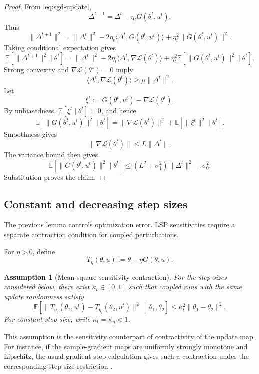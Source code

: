 \documentclass{article}
\newtheorem{assumption}{Assumption}
\numberwithin{equation}{section}
\begin{document}
\begin{proof}
From \eqref{eq:sgd-update},
\[
\Delta^{t+1}
=
\Delta^t-\eta_tG(\theta^t,u^t).
\]
Thus
\[
\|\Delta^{t+1}\|^2
=
\|\Delta^t\|^2
-
2\eta_t\langle \Delta^t,G(\theta^t,u^t)\rangle
+
\eta_t^2\|G(\theta^t,u^t)\|^2 .
\]
Taking conditional expectation gives
\[
\mathbb{E}
[
\|\Delta^{t+1}\|^2
\mid
\theta^t
]
=
\|\Delta^t\|^2
-
2\eta_t
\langle
\Delta^t,\nabla\mathcal{L}(\theta^t)
\rangle
+
\eta_t^2
\mathbb{E}
[
\|G(\theta^t,u^t)\|^2
\mid
\theta^t
].
\]
Strong convexity and \(\nabla\mathcal{L}(\theta^\star)=0\) imply
\[
\langle \Delta^t,\nabla\mathcal{L}(\theta^t)\rangle
\ge
\mu\|\Delta^t\|^2 .
\]
Let
\[
\xi^t:=G(\theta^t,u^t)-\nabla\mathcal{L}(\theta^t).
\]
By unbiasedness, \(\mathbb{E}[\xi^t\mid\theta^t]=0\), and hence
\[
\mathbb{E}
[
\|G(\theta^t,u^t)\|^2
\mid
\theta^t
]
=
\|\nabla\mathcal{L}(\theta^t)\|^2
+
\mathbb{E}
[
\|\xi^t\|^2
\mid
\theta^t
].
\]
Smoothness gives
\[
\|\nabla\mathcal{L}(\theta^t)\|
\le
L\|\Delta^t\|.
\]
The variance bound then gives
\[
\mathbb{E}
[
\|G(\theta^t,u^t)\|^2
\mid
\theta^t
]
\le
(L^2+\sigma_1^2)\|\Delta^t\|^2+\sigma_0^2 .
\]
Substitution proves the claim.
\end{proof}

\subsection{Constant and decreasing step sizes}
\label{subsec:sgd-temporal-stability}

The previous lemma controls optimization error. LSP sensitivities require a
separate contraction condition for coupled perturbations.

For \(\eta>0\), define
\[
T_\eta(\theta,u):=\theta-\eta G(\theta,u).
\]

\begin{assumption}[Mean-square sensitivity contraction]
\label{ass:sgd-sensitivity-contraction}
For the step sizes considered below, there exist \(\kappa_t\in[0,1]\) such that
coupled runs with the same update randomness satisfy
\[
\mathbb{E}
\left[
\|T_{\eta_t}(\theta_1,u^t)-T_{\eta_t}(\theta_2,u^t)\|^2
\,\middle|\,
\theta_1,\theta_2
\right]
\le
\kappa_t^2\|\theta_1-\theta_2\|^2 .
\]
For constant step size, write \(\kappa_t=\kappa_\eta<1\).
\end{assumption}

This assumption is the sensitivity counterpart of contractivity of the update
map. For instance, if the sample-gradient maps are uniformly strongly monotone
and Lipschitz, the usual gradient-step calculation gives such a contraction
under the corresponding step-size restriction \cite{Nesterov2004,BottouCurtisNocedal2018}.
\end{document}
